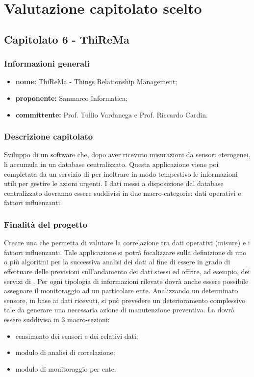 

\section{Valutazione capitolato scelto}

	\subsection{Capitolato 6 - ThiReMa}

	\subsubsection{Informazioni generali}
	\begin{itemize}
		\item \textbf{nome:} ThiReMa - Things Relationship Management;
		\item \textbf{proponente:} Sanmarco Informatica;
		\item \textbf{committente:} Prof. Tullio Vardanega e Prof. Riccardo Cardin.
	\end{itemize}

	\subsubsection{Descrizione capitolato}
	Sviluppo di un software che,  dopo aver ricevuto misurazioni da sensori eterogenei, li accumula in un database centralizzato. Questa applicazione viene poi completata da un servizio di  per inoltrare in modo tempestivo le informazioni utili per gestire le azioni urgenti.
	I dati messi a disposizione dal database centralizzato dovranno essere suddivisi in due macro-categorie: dati operativi e fattori influenzanti.

	\subsubsection{Finalità del progetto}
	Creare una  che permetta di valutare la correlazione tra dati operativi (misure) e i fattori influenzanti. Tale applicazione si potrà focalizzare sulla definizione di uno o più algoritmi per la successiva analisi dei dati al fine di essere in grado di effettuare delle previsioni sull’andamento dei dati stessi ed offrire, ad esempio, dei servizi di .
	Per ogni tipologia di informazioni rilevate dovrà anche essere possibile assegnare il monitoraggio ad un particolare ente.
	Analizzando un determinato sensore, in base ai dati ricevuti, si può prevedere un deterioramento complessivo tale da generare una necessaria azione di manutenzione preventiva.
	La  dovrà essere suddivisa in 3 macro-sezioni:
	\begin{itemize}
		\item censimento dei sensori e dei relativi dati;
		\item modulo di analisi di correlazione;
		\item modulo di monitoraggio per ente.
	\end{itemize}

